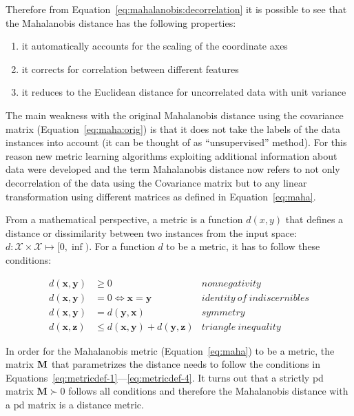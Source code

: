\documentclass[12pt,a4paper]{report}
\begin{document}
Therefore from Equation~\ref{eq:mahalanobis:decorrelation} it is possible to see that the Mahalanobis distance has the following properties:
\begin{enumerate}
\item it automatically accounts for the scaling of the coordinate axes
\item it corrects for correlation between different features
\item it reduces to the Euclidean distance for uncorrelated data with unit variance
\end{enumerate}

The main weakness with the original Mahalanobis distance using the covariance matrix (Equation~\ref{eq:maha:orig}) is that it does not take the labels of the data instances into account (it can be thought of as ``unsupervised'' method). For this reason new metric learning algorithms exploiting additional information about data were developed and the term Mahalanobis distance now refers to not only decorrelation of the data using the Covariance matrix but to any linear transformation using different matrices as defined in Equation~\ref{eq:maha}.

From a mathematical perspective, a metric is a function $d(x,y)$ that defines a distance or dissimilarity between two instances from the input space: $d:\mathcal{X} \times \mathcal{X} \mapsto [0,\inf)$. For a function $d$ to be a metric, it has to follow these conditions:

\begin{align}
d(\textbf{x},\textbf{y}) &\geq 0 & nonnegativity \label{eq:metricdef-1} \\
d(\textbf{x},\textbf{y}) &= 0 \iff \textbf{x}=\textbf{y} & identity \ of \ indiscernibles \label{eq:metricdef-2} \\
d(\textbf{x},\textbf{y}) &= d(\textbf{y},\textbf{x}) & symmetry \label{eq:metricdef-3} \\
d(\textbf{x},\textbf{z}) &\leq d(\textbf{x},\textbf{y}) + d(\textbf{y},\textbf{z}) & triangle \ inequality \label{eq:metricdef-4}
\end{align} 

In order for the Mahalanobis metric (Equation~\ref{eq:maha}) to be a metric, the matrix $\bf{M}$ that parametrizes the distance needs to follow the conditions in Equations~\ref{eq:metricdef-1}---\ref{eq:metricdef-4}. It turns out that a strictly \ac{pd} matrix $\bm{M} \succ 0$ follows all conditions and therefore the Mahalanobis distance with a \ac{pd} matrix is a distance metric.
\end{document}
